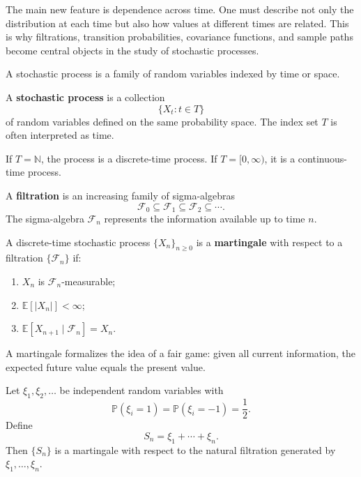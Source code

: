 The main new feature is dependence across time. One must describe not only the distribution at each time but also how values at different times are related. This is why filtrations, transition probabilities, covariance functions, and sample paths become central objects in the study of stochastic processes.

A stochastic process is a family of random variables indexed by time or space.

\begin{definition}
A \textbf{stochastic process} is a collection
\[
    \{X_t:t\in T\}
\]
of random variables defined on the same probability space. The index set $T$ is often interpreted as time.
\end{definition}

\begin{example}
If $T=\mathbb{N}$, the process is a discrete-time process. If $T=[0,\infty)$, it is a continuous-time process.
\end{example}

\begin{definition}[Filtration]
A \textbf{filtration} is an increasing family of sigma-algebras
\[
    \mathcal{F}_0\subseteq\mathcal{F}_1\subseteq\mathcal{F}_2\subseteq\cdots.
\]
The sigma-algebra $\mathcal{F}_n$ represents the information available up to time $n$.
\end{definition}

\begin{definition}[Martingale]
A discrete-time stochastic process $\{X_n\}_{n\geq 0}$ is a \textbf{martingale} with respect to a filtration $\{\mathcal{F}_n\}$ if:
\begin{enumerate}
    \item $X_n$ is $\mathcal{F}_n$-measurable;
    \item $\mathbb{E}[|X_n|]<\infty$;
    \item $\mathbb{E}[X_{n+1}\mid\mathcal{F}_n]=X_n$.
\end{enumerate}
\end{definition}

\begin{remark}
A martingale formalizes the idea of a fair game: given all current information, the expected future value equals the present value.
\end{remark}

\begin{example}
Let $\xi_1,\xi_2,\dots$ be independent random variables with
\[
    \mathbb{P}(\xi_i=1)=\mathbb{P}(\xi_i=-1)=\frac12.
\]
Define
\[
    S_n=\xi_1+\cdots+\xi_n.
\]
Then $\{S_n\}$ is a martingale with respect to the natural filtration generated by $\xi_1,\dots,\xi_n$.
\end{example}

